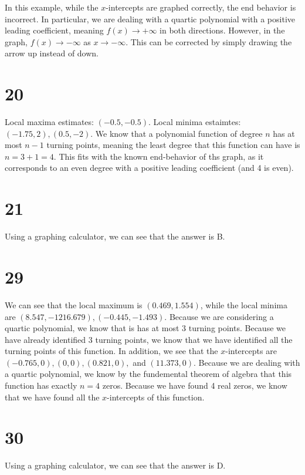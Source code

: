 \documentclass{article}
\theoremstyle{definition}
\begin{document}
In this example, while the $x$-intercepts are graphed correctly, the end behavior is incorrect. In particular, we are dealing with a quartic polynomial with a positive leading 
coefficient, meaning $f(x)\rightarrow +\infty$ in both directions. However, in the graph, $f(x)\rightarrow -\infty$ as $x\rightarrow -\infty$. This can be corrected by 
simply drawing the arrow up instead of down.

\section*{20}


Local maxima estimates: $(-0.5,-0.5)$. Local minima estaimtes: $(-1.75,2),(0.5,-2)$. We know that a polynomial function of degree $n$ has at most $n-1$ turning points, 
meaning the least degree that this function can have is $n=3+1=4$. This fits with the known end-behavior of ths graph, as it corresponds to an even degree with a positive 
leading coefficient (and 4 is even).

\section*{21}


Using a graphing calculator, we can see that the answer is B.

\section*{29}

We can see that the local maximum is $(0.469,1.554)$, while the local minima are 
$(8.547,-1216.679),(-0.445,-1.493)$. 
Because we are considering a quartic polynomial, we know that is has at most 
$3$ turning points. Because we have already identified 3 turning points, we know that we have identified 
all the turning points of this function. In addition, we see that the $x$-intercepts are $(-0.765,0),(0,0),(0.821,0),$ and $(11.373,0)$. Because we are dealing with a quartic polynomial, 
we know by the fundemental theorem of algebra that this function has exactly $n=4$ zeros. Because we have found 4 real zeros, we know that we have found all the $x$-intercepts 
of this function.

\section*{30}


Using a graphing calculator, we can see that the answer is D.
\end{document}
